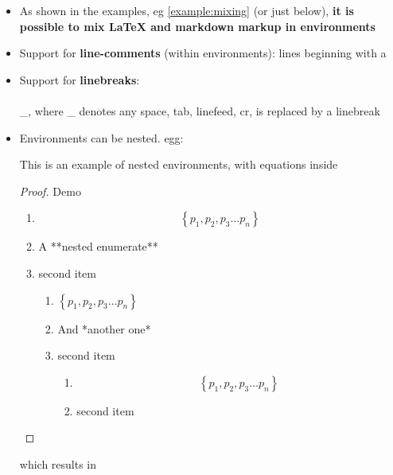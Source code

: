     \begin{itemize}
\item
  As shown in the examples, eg \ref{example:mixing} (or just below),
  \textbf{it is possible to mix LaTeX and markdown markup in
  environments}
\item
  Support for \textbf{line-comments} (within environments): lines
  beginning with a %
\item
  Support for \textbf{linebreaks}: \\\\\_, where \_ denotes
  any space, tab, linefeed, cr, is replaced by a linebreak
\item
  Environments can be nested. egg:

  \begin{listing}
  This is an example of nested environments, with equations inside\\
  \begin{proof} Demo
  \begin{enumerate}
  \item $$ \left\{ p_1, p_2, p_3 \ldots p_n \right\} $$
  \item A **nested enumerate**
  \item second item 
  \begin{enumerate}
  \item $ \left\{ p_1, p_2, p_3 \ldots p_n \right\} $
  \item And *another one*
  \item second item 
  \begin{enumerate}
  \item $$ \left\{ p_1, p_2, p_3 \ldots p_n \right\} $$
  \item second item 
  \end{enumerate}
  \end{enumerate}
  \end{enumerate}
  \end{proof}
  \end{listing}

  which results in
\end{itemize}

